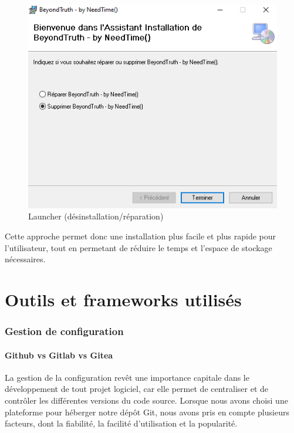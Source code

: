 \documentclass[
	article,			%
	11pt,				%
	oneside,			%
	a4paper,			%
	chapter=TITLE,
	french,			%
	sumario=tradicional
	]{base_nt}
\begin{document}
\begin{figure}[ht]
	\caption{Launcher (désinstallation/réparation)}
	\centering
	\includegraphics[width=1\linewidth]{paper11.png}
	\legend{}
	
\end{figure}

Cette approche permet donc une installation plus facile et plus rapide pour l'utilisateur, tout en permetant de réduire le temps et l'espace de stockage nécessaires.

\newpage

\part{Outils et frameworks utilisés}

\section{Gestion de configuration}

\subsection{Github vs Gitlab vs Gitea}


La gestion de la configuration revêt une importance capitale dans le développement de tout projet logiciel, car elle permet de centraliser et de contrôler les différentes versions du code source. Lorsque nous avons choisi une plateforme pour héberger notre dépôt Git, nous avons pris en compte plusieurs facteurs, dont la fiabilité, la facilité d'utilisation et la popularité.
\end{document}
